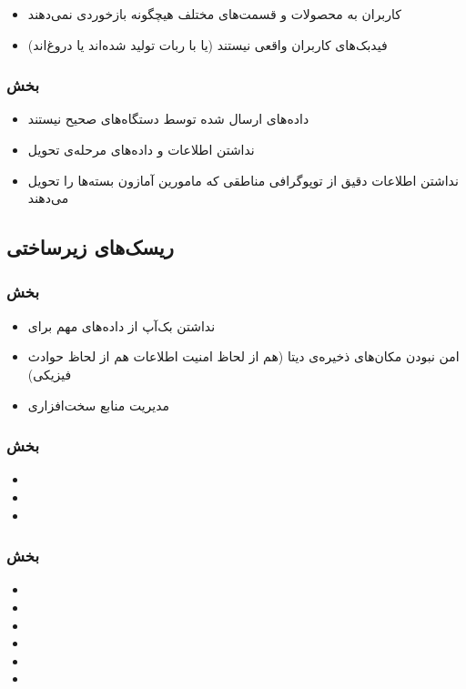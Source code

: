 \begin{itemize}
\item 
کاربران به محصولات و قسمت‌‌های مختلف هیچگونه بازخوردی نمی‌دهند
\item 
فید‌بک‌های کاربران واقعی نیستند (یا با ربات تولید شده‌اند یا دروغ‌اند)
\end{itemize}

\subsubsection{بخش }
\begin{itemize}
\item
داده‌های ارسال شده توسط دستگاه‌های 
صحیح نیستند
\item 
نداشتن اطلاعات و داده‌های مرحله‌ی تحویل
\item  
نداشتن اطلاعات دقیق از توپوگرافی مناطقی که مامورین آمازون بسته‌ها را تحویل می‌دهند
\end{itemize}

\subsection{ریسک‌های زیرساختی}
\subsubsection{بخش }
\begin{itemize}
\item
نداشتن بک‌آپ از داده‌های مهم برای 

\item 
امن نبودن مکان‌های ذخیره‌ی دیتا (هم از لحاظ‌ امنیت اطلاعات هم از لحاظ حوادث فیزیکی)
\item 
مدیریت منابع سخت‌افزاری
\end{itemize}

\subsubsection{بخش }
\begin{itemize}
\item

\item 

\item 
 
\end{itemize}

\subsubsection{بخش }
\begin{itemize}
\item

\item 

\item 
 
\item

\item 

\item  
\end{itemize}

